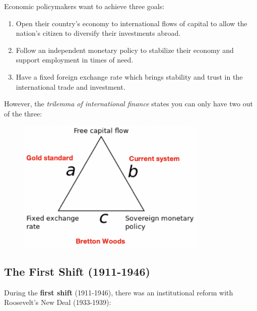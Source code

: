 \documentclass[a4paper]{extarticle}
\begin{document}
Economic policymakers want to achieve three goals:

\begin{enumerate}
    \item Open their country's economy to international flows of capital to allow the nation's citizen to diversify their investments abroad.
    \item Follow an independent monetary policy to stabilize their economy and support employment in times of need.
    \item Have a fixed foreign exchange rate which brings stability and trust in the international trade and investment.
\end{enumerate}

However, the \textit{trilemma of international finance} states you can only have two out of the three:

\begin{figure}[H]
    \includegraphics[width=9cm]{../images/EnpRisk_Fig8-2}
    \centering
\end{figure}

\subsection{The First Shift (1911-1946)}

During the \textbf{first shift} (1911-1946), there was an institutional reform with Roosevelt's New Deal (1933-1939):
\end{document}
